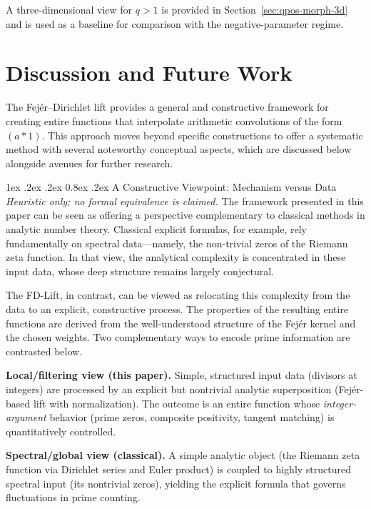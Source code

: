 \documentclass[11pt,a4paper]{amsart}
\makeatletter
\renewcommand\paragraph{\@startsection{paragraph}{4}{\z@}%
  {1ex \@plus .2ex \@minus .2ex}%
  {0.8ex \@plus .2ex}%
  {\normalfont\bfseries}}
\theoremstyle{plain}
\theoremstyle{definition}
\theoremstyle{remark}
\makeatother
\begin{document}
A three-dimensional view for $q>1$ is provided in Section~\ref{sec:qpos-morph-3d} and is used as a baseline for comparison with the negative-parameter regime.


\section{Discussion and Future Work}

The Fej\'er--Dirichlet lift provides a general and constructive framework for creating entire functions that interpolate arithmetic convolutions of the form $(a*1)$. This approach moves beyond specific constructions to offer a systematic method with several noteworthy conceptual aspects, which are discussed below alongside avenues for further research.

\paragraph{A Constructive Viewpoint: Mechanism versus Data}
\emph{Heuristic only; no formal equivalence is claimed.}
The framework presented in this paper can be seen as offering a perspective complementary to classical methods in analytic number theory. Classical explicit formulas, for example, rely fundamentally on spectral data—namely, the non-trivial zeros of the Riemann zeta function. In that view, the analytical complexity is concentrated in these input data, whose deep structure remains largely conjectural.

The FD-Lift, in contrast, can be viewed as relocating this complexity from the data to an explicit, constructive process. The properties of the resulting entire functions are derived from the well-understood structure of the Fej\'er kernel and the chosen weights. Two complementary ways to encode prime information are contrasted below.

\textbf{Local/filtering view (this paper).} Simple, structured input data (divisors at integers) are processed by an explicit but nontrivial analytic superposition (Fej\'er-based lift with normalization). The outcome is an entire function whose \emph{integer-argument} behavior (prime zeros, composite positivity, tangent matching) is quantitatively controlled.

\textbf{Spectral/global view (classical).} A simple analytic object (the Riemann zeta function via Dirichlet series and Euler product) is coupled to highly structured spectral input (its nontrivial zeros), yielding the explicit formula that governs fluctuations in prime counting.
\end{document}

